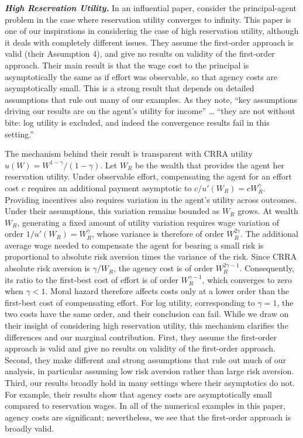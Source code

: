 \medskip\noindent\textit{\textbf{High Reservation Utility.}}
In an influential paper, \textcite{chade2020highstakes} consider the principal-agent problem in the case where reservation utility converges to infinity. This paper is one of our inspirations in considering the case of high reservation utility, although it deals with completely different issues. They assume the first-order approach is valid (their Assumption 4), and give no results on validity of the first-order approach. Their main result is that the wage cost to the principal is asymptotically the same as if effort was observable, so that agency costs are asymptotically small. This is a strong result that depends on detailed assumptions that rule out many of our examples. As they note, ``key assumptions driving our results are on the agent's utility for income'' \ldots{} ``they are not without bite: log utility is excluded, and indeed the convergence results fail in this setting.''

The mechanism behind their result is transparent with CRRA utility $u(W)=W^{1-\gamma}/(1-\gamma)$. Let $W_R$ be the wealth that provides the agent her reservation utility. Under observable effort, compensating the agent for an effort cost $c$ requires an additional payment asymptotic to $c/u'(W_R)=cW_R^\gamma$. Providing incentives also requires variation in the agent's utility across outcomes. Under their assumptions, this variation remains bounded as $W_R$ grows. At wealth $W_R$, generating a fixed amount of utility variation requires wage variation of order $1/u'(W_R)=W_R^\gamma$, whose variance is therefore of order $W_R^{2\gamma}$. The additional average wage needed to compensate the agent for bearing a small risk is proportional to absolute risk aversion times the variance of the risk. Since CRRA absolute risk aversion is $\gamma/W_R$, the agency cost is of order $W_R^{2\gamma-1}$. Consequently, its ratio to the first-best cost of effort is of order $W_R^{\gamma-1}$, which converges to zero when $\gamma<1$. Moral hazard therefore affects costs only at a lower order than the first-best cost of compensating effort. For log utility, corresponding to $\gamma=1$, the two costs have the same order, and their conclusion can fail. While we draw on their insight of considering high reservation utility, this mechanism clarifies the differences and our marginal contribution. First, they assume the first-order approach is valid and give no results on validity of the first-order approach. Second, they make different and strong assumptions that rule out much of our analysis, in particular assuming low risk aversion rather than large risk aversion. Third, our results broadly hold in many settings where their asymptotics do not. For example, their results show that agency costs are asymptotically small compared to reservation wages. In all of the numerical examples in this paper, agency costs are significant; nevertheless, we see that the first-order approach is broadly valid.

